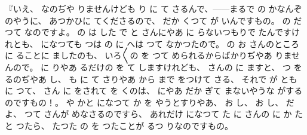 %
『いえ、
%
なのぢや
りませんけども
り
に
て
さるんで、{---}{---}まるで
の
かなんぞのやうに、%
%
あつかひに
てくださるので、
%
だか
くつて
が
いんですもの。
%
の
だつて
なのですよ。
%
の
は
した
で
と
さんにやあ
に
らないつもりで
たんですけれとも、
%
になつても
つは
の
に
へは
つて
なかつたので。
%
の
お
さんのところに
ることに
ましたのも、
%
いろ〳〵の
を
つて
められるからばかりぢやあ
りませんので。
%
に
りやあ
るだけの
を
て
しますけれども、
%
さんの
に
ますと、
%
つ
を
るのぢやあ
し、
%
も
に
て
さりやあ
から
まで
をつけて
さる、
%
それで
が
とも
に
つて、
%
さん
に
をされて
を
くのは、
%
にやあ
だか
ぎて
まないやうな
がするのですもの！。
%
や
かと
になつて
か
を
やうとすりやあ、
%
お
し、
%
お
し、
%
だよ、
%
つて
さんが
めなさるのですら、
%
あれだけ
になつて
た
に
さんの
に
か
たと
つたら、
%
たつた
の
を
つたことが
るつ
りなのですもの。
